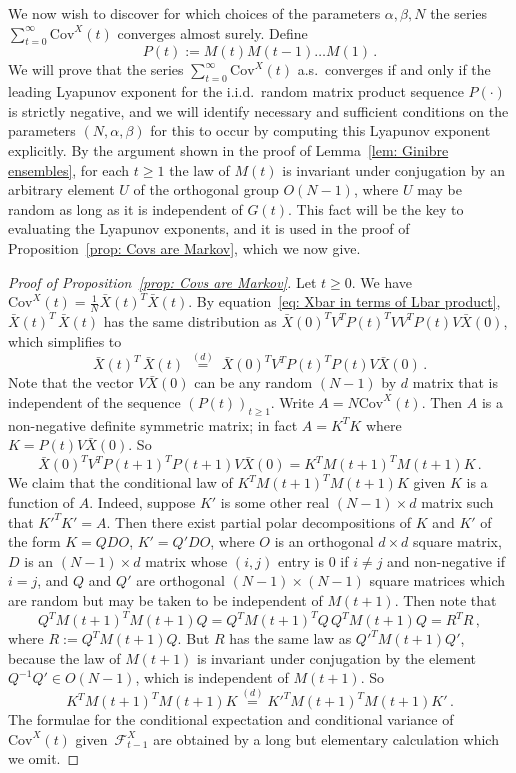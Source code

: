 \documentclass[12pt]{article}
\newcommand{\Cov}{\mathrm{Cov}}
\newcommand{\1}{\mathbf{1}}
\begin{document}
We now wish to discover for which choices of the parameters $\alpha, \beta, N$ the series $\sum_{t=0}^\infty \Cov^X(t)$ converges almost surely.
Define
$$
P(t) := M(t) M(t-1) \dots M(1)\,.
$$  
We will prove that the series $\sum_{t=0}^\infty \Cov^X(t)$ a.s.~converges if and only if the leading Lyapunov exponent for the i.i.d.~random matrix product sequence $P(\cdot)$ is strictly negative, and we will identify necessary and sufficient conditions on the parameters $(N,\alpha, \beta)$  for this to occur by computing this Lyapunov exponent explicitly. By the argument shown in the proof of Lemma~\ref{lem: Ginibre ensembles}, for each $t \ge 1$ the law of $M(t)$ is invariant under conjugation by an arbitrary element $U$ of the orthogonal group $O(N-1)$, where $U$ may be random as long as it is independent of $G(t)$. This fact will be the key to evaluating the Lyapunov exponents, and it is used in the proof of Proposition~\ref{prop: Covs are Markov}, which we now give.
\begin{proof}[Proof of Proposition~\ref{prop: Covs are Markov}]
Let $t \ge 0$. We have $\Cov^X(t) = \frac{1}{N}\bar{X}(t)^T \bar{X}(t)$.  By equation~\eqref{eq: Xbar in terms of Lbar product}, $\bar{X}(t)^T\,\bar{X}(t)$ has the same distribution as $\bar{X}(0)^T V^T P(t)^T V V^T P(t) V \bar{X}(0)$, which simplifies to 
$$
\bar{X}(t)^T\,\bar{X}(t)\;\stackrel{(d)}{=}\;\bar{X}(0)^T V^T P(t)^T P(t) V \bar{X}(0)\,.
$$ 
Note that the vector $V\bar{X}(0)$ can be any random $(N-1)$ by $d$ matrix that is independent of the sequence $\left(P(t)\right)_{t \ge 1}$.   Write $A = N\Cov^X(t)$. Then  $A$ is a non-negative definite symmetric matrix; in fact $A=K^T K$ where $K = P(t) V \bar{X}(0)$. So
$$
\bar{X}(0)^T V^T P(t+1)^T P(t+1) V \bar{X}(0) = K^T M(t+1)^T M(t+1) K\,.
$$
We claim that the conditional law of $K^T M(t+1)^T M(t+1) K$ given $K$ is a function of $A$. Indeed, suppose $K'$ is some other real $(N-1)\times d$ matrix such that $K'^T K' = A$. Then there exist partial polar decompositions of $K$ and $K'$ of the form $K = Q D O$, $K' = Q' D O$, where $O$ is an orthogonal $d\times d$ square matrix, $D$ is an $(N-1)\times d$ matrix whose $(i,j)$ entry is $0$ if $i \neq j$ and non-negative if $i=j$, and $Q$ and $Q'$ are orthogonal $(N-1)\times (N-1)$ square matrices which are random but may be taken to be independent of $M(t+1)$.  Then note that 
$$
Q^T M(t+1)^T M(t+1) Q = Q^T M(t+1)^T Q \, Q^T M(t+1) Q = R^T R\,,
$$ 
where $R:=Q^T M(t+1) Q$. But $R$ has the same law as $Q'^T M(t+1) Q'$, because the law of $M(t+1)$ is invariant under conjugation by the element $Q^{-1}Q' \in O(N-1)$, which is independent of $M(t+1)$.  So 
$$ 
K^T M(t+1)^T M(t+1) K \stackrel{(d)}{=}  K'^T M(t+1)^T M(t+1) K' \,.
$$
The formulae for the conditional expectation and conditional variance of~$\mathrm{Cov}^X(t)$ given~$\mathcal{F}^X_{t-1}$ are obtained by a long but elementary calculation which we omit.
\end{proof}
\end{document}
